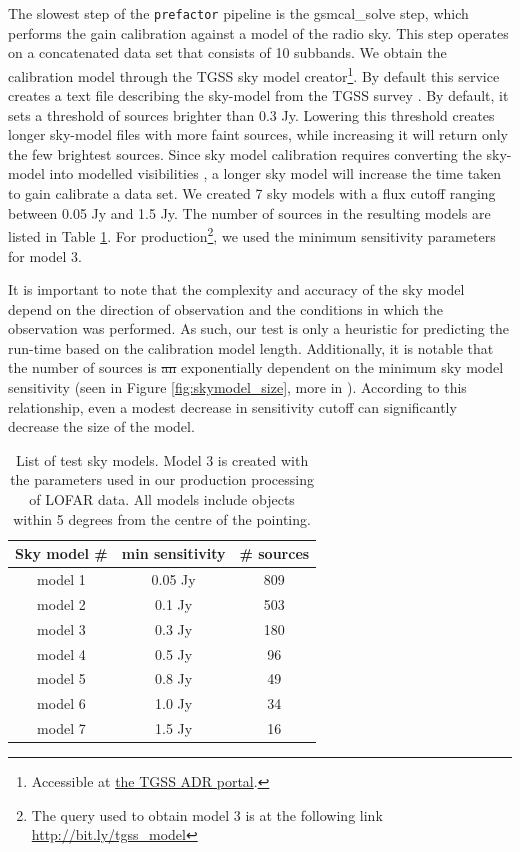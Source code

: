 \documentclass[preprint,5p]{elsarticle}
\providecommand{\DIFadd}[1]{{\protect\color{blue}\uwave{#1}}} %
\providecommand{\DIFdel}[1]{{\protect\color{red}\sout{#1}}}                      %
\providecommand{\DIFaddbegin}{} %
\providecommand{\DIFaddend}{} %
\providecommand{\DIFdelbegin}{} %
\providecommand{\DIFdelend}{} %
\newcommand{\DIFscaledelfig}{0.5}
\newlength{\DIFdelgraphicswidth} %
\newlength{\DIFdelgraphicsheight} %
\newcommand{\DIFaddincludegraphics}[2][]{{\color{blue}\fbox{\DIFOincludegraphics[#1]{#2}}}} %
\newcommand{\DIFdelincludegraphics}[2][]{%
\sbox{\DIFdelgraphicsbox}{\DIFOincludegraphics[#1]{#2}}%
\settoboxwidth{\DIFdelgraphicswidth}{\DIFdelgraphicsbox} %
\settoboxtotalheight{\DIFdelgraphicsheight}{\DIFdelgraphicsbox} %
\scalebox{\DIFscaledelfig}{%
\parbox[b]{\DIFdelgraphicswidth}{\usebox{\DIFdelgraphicsbox}\\[-\baselineskip] \rule{\DIFdelgraphicswidth}{0em}}\llap{\resizebox{\DIFdelgraphicswidth}{\DIFdelgraphicsheight}{%
\setlength{\unitlength}{\DIFdelgraphicswidth}%
\begin{picture}(1,1)%
\thicklines\linethickness{2pt} %
{\color[rgb]{1,0,0}\put(0,0){\framebox(1,1){}}}%
{\color[rgb]{1,0,0}\put(0,0){\line( 1,1){1}}}%
{\color[rgb]{1,0,0}\put(0,1){\line(1,-1){1}}}%
\end{picture}%
}\hspace*{3pt}}} %
} %
\DeclareRobustCommand{\DIFaddbegin}{\DIFOaddbegin \let\includegraphics\DIFaddincludegraphics} %
\DeclareRobustCommand{\DIFaddend}{\DIFOaddend \let\includegraphics\DIFOincludegraphics} %
\DeclareRobustCommand{\DIFdelbegin}{\DIFOdelbegin \let\includegraphics\DIFdelincludegraphics} %
\DeclareRobustCommand{\DIFdelend}{\DIFOaddend \let\includegraphics\DIFOincludegraphics} %
\begin{document}
The slowest step of the \texttt{prefactor} pipeline is the \DIFaddbegin {\selectfont \DIFaddend gsmcal\_solve\DIFaddbegin } \DIFaddend step, which performs the gain calibration against a model of the radio sky. This step operates on a concatenated data set that consists of 10 subbands. We obtain the calibration model through the TGSS sky model creator\footnote{Accessible at \href{http://tgssadr.strw.leidenuniv.nl/doku.php}{the TGSS ADR portal}.}. By default this service creates a text file describing the sky-model from the TGSS survey \citep{tgssadr} \DIFaddbegin \DIFadd{as a combination of gaussians and point sources}\DIFaddend . By default, it sets a threshold of sources brighter than 0.3 Jy. 
Lowering this threshold creates longer sky-model files with more faint sources, while increasing it will return only the few brightest sources. Since sky model calibration requires converting the sky-model into modelled visibilities \citep[e.g.][]{dppp, radio_visibility_sage,app_synth}, a longer sky model will increase the time taken to gain calibrate a data set. We created 7 sky models with a flux cutoff ranging between 0.05 Jy and 1.5 Jy. The number of sources in the resulting models are listed in Table \ref{table:skymodels}. 
For production\footnote{The query used to obtain model 3 is at the following link \url{http://bit.ly/tgss_model}}, we used the minimum sensitivity parameters for model 3.


It is important to note that the complexity and accuracy of the sky model depend on the direction of observation and the conditions in which the observation was performed. As such, our test is only a heuristic for predicting the run-time based on the calibration model length. Additionally, it is notable that the number of sources is \DIFdelbegin \DIFdel{an }\DIFdelend exponentially dependent on the minimum sky model sensitivity (seen in Figure \ref{fig:skymodel_size}, more in \citealt{tgssadr,Wendy_bootes}). According to this relationship, even a modest decrease in sensitivity cutoff can significantly decrease the size of the model.

\begin{table}[!ht]
\centering
\begin{tabular}{||c| c | c||} 
 \hline
 Sky model \# & min sensitivity & \# sources  \\ [0.5ex] 
 \hline
 model 1 & 0.05 Jy & 809    \\ 
 model 2 & 0.1 Jy & 503   \\
 \rowcolor{Gray}
  \hline
 model 3 & 0.3 Jy & 180   \\
  \hline
 model 4 & 0.5 Jy & 96  \\
 model 5 & 0.8 Jy & 49   \\ 
 model 6 & 1.0 Jy & 34   \\
 model 7 & 1.5 Jy & 16   \\[1ex] 
 \hline
\end{tabular}
\caption{List of test sky models. Model 3 is created with the parameters used in our production processing of LOFAR data. All models include objects within 5 degrees from the centre of the pointing.  }
\label{table:skymodels}
\end{table}
\end{document}

